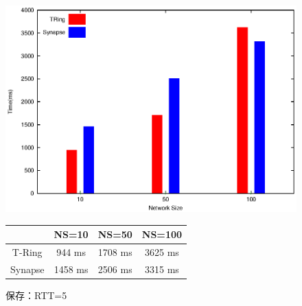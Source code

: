 \begin{figure}[htbp]
\begin{minipage}{1\textwidth}
    \centering
\includegraphics[width=14cm]{./images/compare_store_rtt5.eps}
\begin{center}
  \begin{tabular}{|c||c|c|c|} \hline
    \backslashbox{}{} & NS=10 & NS=50 & NS=100  \\ \hline \hline
       T-Ring & 944 ms & 1708 ms & 3625 ms  \\ \hline
       Synapse & 1458  ms & 2506 ms & 3315 ms \\ \hline
  \end{tabular}
\end{center}
\caption{保存：RTT=5}
 \label{fig:compare_store_rtt5}
 \end{minipage}
\end{figure}


